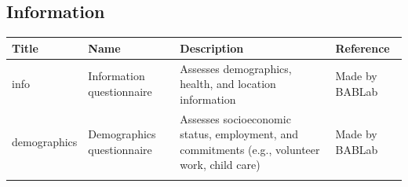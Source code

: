 \documentclass[]{book}
\begin{document}
\hypertarget{information}{%
\subsection{Information}\label{information}}

\begin{longtable}[]{@{}llll@{}}
\toprule
\begin{minipage}[b]{0.22\columnwidth}\raggedright
Title\strut
\end{minipage} & \begin{minipage}[b]{0.27\columnwidth}\raggedright
Name\strut
\end{minipage} & \begin{minipage}[b]{0.22\columnwidth}\raggedright
Description\strut
\end{minipage} & \begin{minipage}[b]{0.18\columnwidth}\raggedright
Reference\strut
\end{minipage}\tabularnewline
\midrule
\endhead
\begin{minipage}[t]{0.22\columnwidth}\raggedright
info\strut
\end{minipage} & \begin{minipage}[t]{0.27\columnwidth}\raggedright
Information questionnaire\strut
\end{minipage} & \begin{minipage}[t]{0.22\columnwidth}\raggedright
Assesses demographics, health, and location information\strut
\end{minipage} & \begin{minipage}[t]{0.18\columnwidth}\raggedright
Made by BABLab\strut
\end{minipage}\tabularnewline
\begin{minipage}[t]{0.22\columnwidth}\raggedright
demographics\strut
\end{minipage} & \begin{minipage}[t]{0.27\columnwidth}\raggedright
Demographics questionnaire\strut
\end{minipage} & \begin{minipage}[t]{0.22\columnwidth}\raggedright
Assesses socioeconomic status, employment, and commitments (e.g., volunteer work, child care)\strut
\end{minipage} & \begin{minipage}[t]{0.18\columnwidth}\raggedright
Made by BABLab\strut
\end{minipage}\tabularnewline
\begin{minipage}[t]{0.22\columnwidth}\raggedright

\end{minipage}
\end{longtable}
\end{document}

